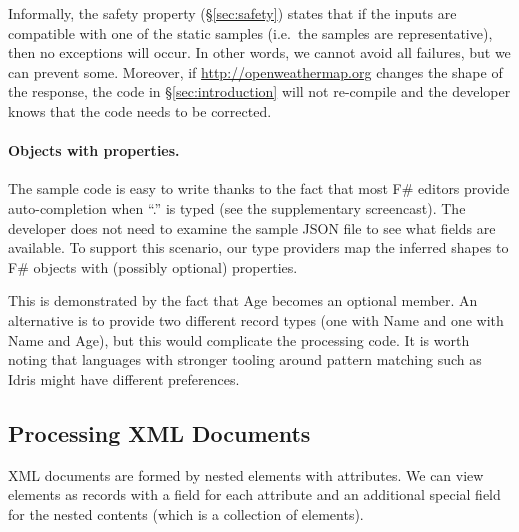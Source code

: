 \documentclass[pldi-cameraready]{sigplanconf-pldi16}
\newcommand{\ident}[1]{\textnormal{\sffamily #1}}
\begin{document}
Informally, the safety property (\S\ref{sec:safety}) states that if the inputs are compatible
with one of the static samples (i.e.~the samples are representative), then no exceptions will
occur. In other words, we cannot avoid all failures, but we can prevent some. Moreover, if
\url{http://openweathermap.org} changes the shape of the response, the code in \S\ref{sec:introduction}
will not re-compile and the developer knows that the code needs to be corrected.

\paragraph{Objects with properties.}
The sample code is easy to write thanks to the fact that most F\# editors provide auto-completion
when ``.'' is typed (see the supplementary screencast). The developer does not need to examine the
sample JSON file to see what fields are available. To support this scenario, our type providers
map the inferred shapes to F\# objects with (possibly optional) properties.

This is demonstrated by the fact that \ident{Age} becomes an optional member.
An alternative is to provide two different record types (one with \ident{Name} and one with
\ident{Name} and \ident{Age}), but this would complicate the processing code.
It is worth noting that languages with stronger tooling around pattern matching
such as Idris \cite{idris-tools} might have different preferences.


\subsection{Processing XML Documents}
\label{sec:providers-xml}

XML documents are formed by nested elements with attributes. We can view elements as records with
a field for each attribute and an additional special field for the nested contents (which is a
collection of elements).
\end{document}

